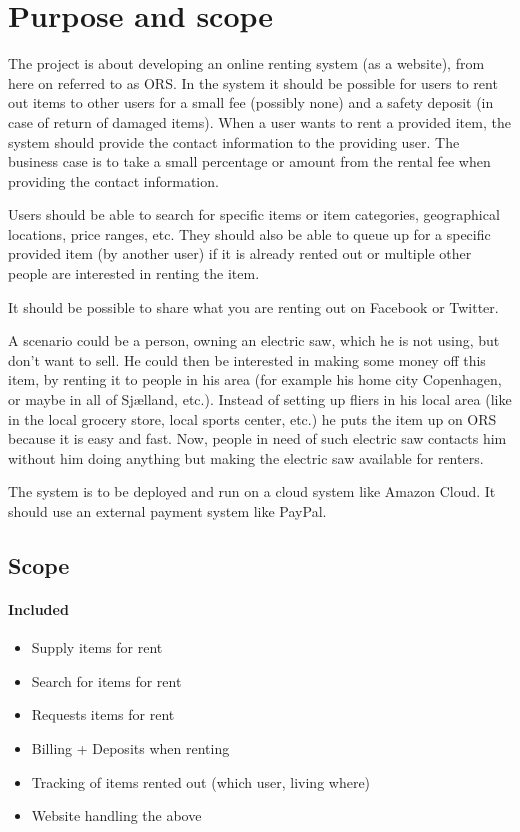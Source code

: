 \documentclass[a4paper,11pt]{report}
\begin{document}
\section{Purpose and scope}
\label{sec:purpose-scope}
The project is about developing an online renting system (as a website), from
here on referred to as ORS. In the system it should be possible for users to
rent out items to other users for a small fee (possibly none) and a safety
deposit (in case of return of damaged items). When a user wants to rent a
provided item, the system should provide the contact information to the
providing user. The business case is to take a small percentage or amount from
the rental fee when providing the contact information.

Users should be able to search for specific items or item categories,
geographical locations, price ranges, etc. They should also be able to queue up
for a specific provided item (by another user) if it is already rented out or
multiple other people are interested in renting the item.

It should be possible to share what you are renting out on Facebook or Twitter.

A scenario could be a person, owning an electric saw, which he is not using, but
don't want to sell. He could then be interested in making some money off this
item, by renting it to people in his area (for example his home city Copenhagen,
or maybe in all of Sjælland, etc.). Instead of setting up fliers in his local
area (like in the local grocery store, local sports center, etc.) he puts the
item up on ORS because it is easy and fast. Now, people in need of such electric
saw contacts him without him doing anything but making the electric saw
available for renters.

The system is to be deployed and run on a cloud system like Amazon Cloud. It
should use an external payment system like PayPal.

\subsection{Scope}
\paragraph{Included}
\begin{itemize}
\item Supply items for rent
\item Search for items for rent
\item Requests items for rent
\item Billing + Deposits when renting
\item Tracking of items rented out (which user, living where)
\item Website handling the above
\end{itemize}
\end{document}
